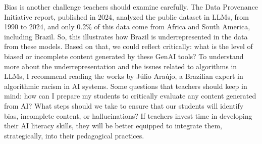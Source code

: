 \documentclass[english]{textolivre}
\begin{document}
{   Bias is another challenge teachers should examine carefully. The Data Provenance Initiative report, published in 2024, analyzed the public dataset in LLMs, from 1990 to 2024, and only 0.2\% of this data come from Africa and South America, including Brazil. So, this illustrates how Brazil is underrepresented in the data from these models. Based on that, we could reflect critically: what is the level of biased or incomplete content generated by these GenAI tools? To understand more about the underrepresentation and the issues related to algorithms in LLMs, I recommend reading the works by Júlio Araújo, a Brazilian expert in algorithmic racism in AI systems. Some questions that teachers should keep in mind: how can I prepare my students to critically evaluate any content generated from AI? What steps should we take to ensure that our students will identify bias, incomplete content, or hallucinations? If teachers invest time in developing their AI literacy skills, they will be better equipped to integrate them, strategically, into their pedagogical practices.
}
    \begin{description}
        \interviewcontent
    \end{description}
\end{document}
